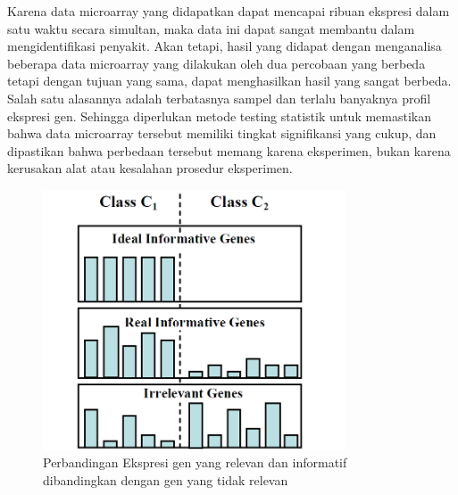 Karena data microarray yang didapatkan dapat mencapai ribuan ekspresi dalam satu waktu secara simultan, maka data ini dapat sangat membantu dalam mengidentifikasi penyakit. Akan tetapi, hasil yang didapat dengan menganalisa beberapa data microarray yang dilakukan oleh dua percobaan yang berbeda tetapi dengan tujuan yang sama, dapat menghasilkan hasil yang sangat berbeda. Salah satu alasannya adalah terbatasnya sampel dan terlalu banyaknya profil ekspresi gen. Sehingga diperlukan metode testing statistik untuk memastikan bahwa data microarray tersebut memiliki tingkat signifikansi yang cukup, dan dipastikan bahwa perbedaan tersebut memang karena eksperimen, bukan karena kerusakan alat atau kesalahan prosedur eksperimen.
\begin{figure}
	\centering
	\includegraphics[width=0.8\textwidth]
		{pics/relevansigen.png}
	\caption{Perbandingan Ekspresi gen yang relevan dan informatif dibandingkan dengan gen yang tidak relevan\citep{babu2004introduction}}
	\label{fig:relevansi}
\end{figure}


